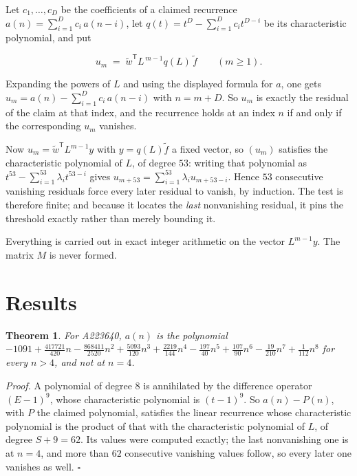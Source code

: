 \documentclass[11pt]{article}
\newtheorem{theorem}{Theorem}
\theoremstyle{definition}
\begin{document}
Let $c_1,\dots,c_D$ be the coefficients of a claimed recurrence $a(n) = \sum_{i=1}^{D} c_i\,a(n-i)$, let $q(t) = t^{D} - \sum_{i=1}^{D} c_i t^{D-i}$ be its characteristic polynomial, and put

\[u_m \;=\; \tilde w^{\mathsf T} L^{\,m-1} q(L)\,\tilde f \qquad (m \ge 1).\]

Expanding the powers of $L$ and using the displayed formula for $a$, one gets $u_m = a(n) - \sum_{i=1}^{D} c_i\,a(n-i)$ with $n = m + D$. So $u_m$ is exactly the residual of the claim at that index, and the recurrence holds at an index $n$ if and only if the corresponding $u_m$ vanishes.

Now $u_m = \tilde w^{\mathsf T} L^{m-1} y$ with $y = q(L)\tilde f$ a fixed vector, so $(u_m)$ satisfies the characteristic polynomial of $L$, of degree $53$: writing that polynomial as $t^{53} - \sum_{i=1}^{53} \lambda_i t^{53-i}$ gives $u_{m+53} = \sum_{i=1}^{53} \lambda_i u_{m+53-i}$. Hence $53$ consecutive vanishing residuals force every later residual to vanish, by induction. The test is therefore finite; and because it locates the {\itshape last} nonvanishing residual, it pins the threshold exactly rather than merely bounding it.

Everything is carried out in exact integer arithmetic on the vector $L^{m-1}y$. The matrix $M$ is never formed.

\section{Results}

\begin{theorem} For A223640, $a(n)$ is the polynomial $-1091 + \frac{417721}{420}n - \frac{868411}{2520}n^{2} + \frac{5093}{120}n^{3} + \frac{2219}{144}n^{4} - \frac{197}{40}n^{5} + \frac{107}{90}n^{6} - \frac{19}{210}n^{7} + \frac{1}{112}n^{8}$ for every $n > 4$, and not at $n = 4$.\end{theorem}

{\itshape Proof.} A polynomial of degree $8$ is annihilated by the difference operator $(E-1)^{9}$, whose characteristic polynomial is $(t-1)^{9}$. So $a(n) - P(n)$, with $P$ the claimed polynomial, satisfies the linear recurrence whose characteristic polynomial is the product of that with the characteristic polynomial of $L$, of degree $S + 9 = 62$. Its values were computed exactly; the last nonvanishing one is at $n = 4$, and more than $62$ consecutive vanishing values follow, so every later one vanishes as well. $\square$
\end{document}
